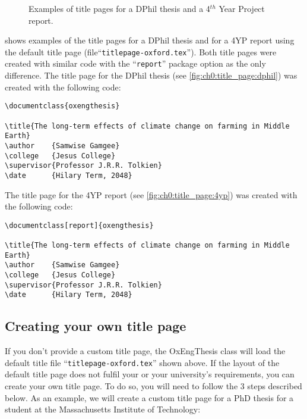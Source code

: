 \begin{figure}[htb]
    \centering
    \caption[Examples of title pages for a DPhil thesis and a 4$^{th}$ Year Project report]
    {
        Examples of title pages for a  DPhil thesis and a
         4$^{th}$ Year Project report.
        \label{fig:ch0:title_page}
    }
\end{figure}


 shows examples of the title pages for a DPhil thesis and for a 4YP report using the default title page (file``\verb|titlepage-oxford.tex|''). Both title pages were created with similar code with the ``\verb|report|'' package option as the only difference. The title page for the DPhil thesis (see \cref{fig:ch0:title_page:dphil}) was created with the following code:


\begin{lstlisting}[style=custom-latex]
\documentclass{oxengthesis}

\title{The long-term effects of climate change on farming in Middle Earth}
\author    {Samwise Gamgee}
\college   {Jesus College}
\supervisor{Professor J.R.R. Tolkien}
\date      {Hilary Term, 2048}
\end{lstlisting}


\noindent The title page for the 4YP report (see \cref{fig:ch0:title_page:4yp}) was created with the following code:


\begin{lstlisting}[style=custom-latex]
\documentclass[report]{oxengthesis}

\title{The long-term effects of climate change on farming in Middle Earth}
\author    {Samwise Gamgee}
\college   {Jesus College}
\supervisor{Professor J.R.R. Tolkien}
\date      {Hilary Term, 2048}
\end{lstlisting}


\subsection{Creating your own title page}


If you don't provide a custom title page, the OxEngThesis class will load the default title file 
``\verb|titlepage-oxford.tex|'' shown above. If the layout of the default title page does not fulfil your or your university's requirements, you can create your own title page. To do so, you will need to follow the 3 steps described below. As an example, we will create a custom title page for a
PhD thesis for a student at the Massachusetts Institute of Technology:

